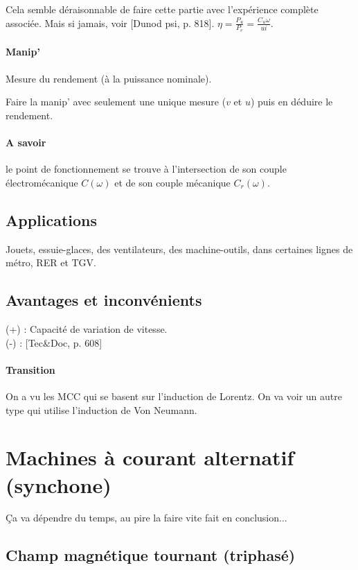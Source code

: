 \documentclass[11pt]{report}
\numberwithin{figure}{section}
\numberwithin{equation}{section}
\numberwithin{table}{section}
\newcommand{\1}{\boldsymbol{1}}
\begin{document}
Cela semble déraisonnable de faire cette partie avec l'expérience complète associée. Mais si jamais, voir [Dunod psi, p. 818]. $\eta = \frac{P_u}{P_e} = \frac{C_u \omega}{ui}$. 

\paragraph{Manip'} Mesure du rendement (à la puissance nominale).

Faire la manip' avec seulement une unique mesure ($v$ et $u$) puis en déduire le rendement.

\paragraph{A savoir} le point de fonctionnement se trouve à l'intersection de son couple électromécanique $C(\omega)$ et de son couple mécanique $C_r(\omega)$.

\subsection{Applications}

Jouets, essuie-glaces, des ventilateurs, des machine-outils, dans certaines lignes de métro, RER et TGV.

\subsection{Avantages et inconvénients}

\noindent (+) : Capacité de variation de vitesse. \\
(-) : [Tec\&Doc, p. 608]

\paragraph{Transition} On a vu les MCC qui se basent sur l'induction de Lorentz. On va voir un autre type qui utilise l'induction de Von Neumann.

\section{Machines à courant alternatif (synchone)}

Ça va dépendre du temps, au pire la faire vite fait en conclusion...

\subsection{Champ magnétique tournant (triphasé)}
\end{document}
